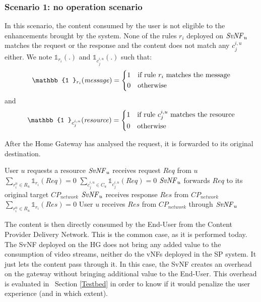 \subsubsection*{Scenario 1: no operation scenario}\label{noop}

In this scenario, the content consumed by the user is not eligible to the enhancements brought by the system. None of the rules $r_{i}$ deployed on $\mathit{SvNF}_{u}$ matches the request or the response and the content does not match any $c^{i,u}_{j}$ either. We note $\mathbb{1}_{r_{i}}(.)$ and $\mathbb{1}_{c^{i,u}_{j}}(.)$ such that:
\[
    \mathbb{1 }_{r_{i}}(\mathit{message})= 
\begin{dcases}
    1& \text{if rule $r_{i}$ matches the message} \\
    0              & \text{otherwise}
\end{dcases}
\]
and 
\[
    \mathbb{1 }_{c^{i,u}_{j}}(\mathit{resource})= 
\begin{dcases}
    1& \text{if rule $c^{i,u}_{j}$ matches the resource} \\
    0              & \text{otherwise}
\end{dcases}
\]

After the Home Gateway has analysed the request, it is forwarded to its original destination.

\begin{algorithmic}[1]
	
\STATE User $u$ requests a resource
\STATE $\mathit{SvNF}_{u}$ receives request $\mathit{Req}$ from $u$
\STATE \( \sum_{r^{u}_{i}\in R_{u}}{\mathbb{1}_{r_{i}}(\mathit{Req})}=0 \)
\STATE \( \sum_{c^{i,u}_{j}\in C_{u}}{\mathbb{1}_{c^{i,u}_{j}}(\mathit{Req})}=0 \)
\STATE $\mathit{SvNF}_{u}$ forwards $\mathit{Req}$ to its original target \(\mathit{CP}_{\mathit{network}}\)
\STATE $\mathit{SvNF}_{u}$ receives response $\mathit{Res}$ from \(\mathit{CP}_{\mathit{network}}\)
\STATE \( \sum_{r^{u}_{i}\in R_{u}}{\mathbb{1}_{r_{i}}(\mathit{Res})}=0 \)
\STATE User $u$ receives $\mathit{Res}$ from \(\mathit{CP}_{\mathit{network}}\) through $\mathit{SvNF}_{u}$
\end{algorithmic}


The content is then directly consumed by the End-User from the Content Provider Delivery Network.
This is the common case, as it is performed today. The SvNF deployed on the HG does not bring any added value to the consumption of video streams, neither do the vNFs deployed in the SP system. It just lets the content pass through it.
In this case, the SvNF creates an overhead on the gateway without bringing additional value to the End-User.
This overhead is evaluated in ~Section \ref{Testbed} in order to know if it would penalize the user experience (and in which extent).

